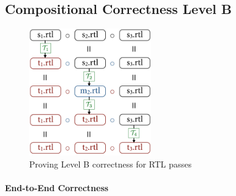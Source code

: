 


\subsection{Compositional Correctness Level B}
\label{sec:overview:LevelB}

\begin{figure}[!t]
\begin{center}
\includegraphics[width=200px]{sepcomp-levelb.png}
\end{center}
\caption{Proving Level B correctness for RTL passes}
\label{fig:LevelB}
\end{figure}

\paragraph{End-to-End Correctness}

